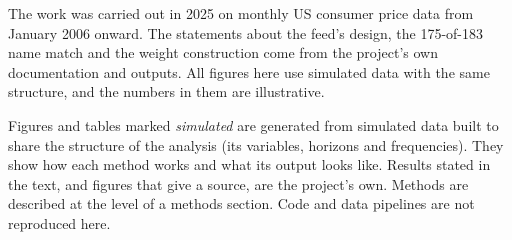 \documentclass[
  british,
  a4paper,
]{article}
\begin{document}
The work was carried out in 2025 on monthly US consumer price data from
January 2006 onward. The statements about the feed's design, the
175-of-183 name match and the weight construction come from the
project's own documentation and outputs. All figures here use simulated
data with the same structure, and the numbers in them are illustrative.

Figures and tables marked \emph{simulated} are generated from simulated
data built to share the structure of the analysis (its variables,
horizons and frequencies). They show how each method works and what its
output looks like. Results stated in the text, and figures that give a
source, are the project's own. Methods are described at the level of a
methods section. Code and data pipelines are not reproduced here.
\end{document}
